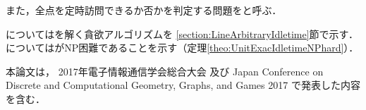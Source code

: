 また，全点を定時訪問できるか否かを判定する問題をと呼ぶ．

{\graphLine}については{\timeSpecifiedPP}を解く貪欲アルゴリズムを
\ref{section:LineArbitraryIdletime}節で示す．
{\graphUnit}については{\timeSpecifiedPPProfit}がNP困難であることを示す（定理\ref{theo:UnitExacIdletimeNPhard}）．


本論文は，
2017年電子情報通信学会総合大会\cite{ieice}%
及び
Japan Conference on Discrete and Computational Geometry, Graphs, and Games 2017\cite{jcdcggg}%
で発表した内容を含む．
